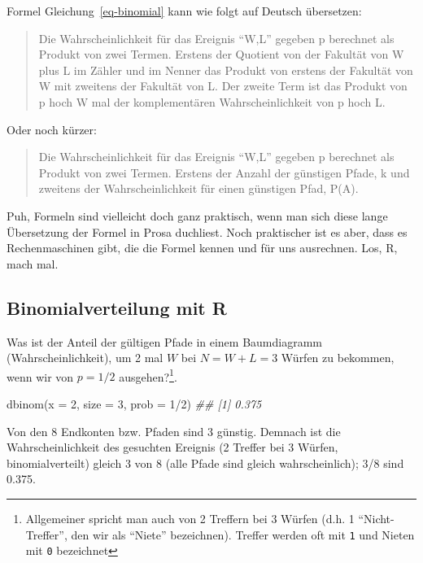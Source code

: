 \documentclass[
  a4paper,
  DIV=11]{scrreprt}
\newenvironment{Shaded}{\begin{snugshade}}{\end{snugshade}}
\newcommand{\AttributeTok}[1]{\textcolor[rgb]{0.40,0.45,0.13}{#1}}
\newcommand{\DecValTok}[1]{\textcolor[rgb]{0.68,0.00,0.00}{#1}}
\newcommand{\DocumentationTok}[1]{\textcolor[rgb]{0.37,0.37,0.37}{\textit{#1}}}
\newcommand{\FunctionTok}[1]{\textcolor[rgb]{0.28,0.35,0.67}{#1}}
\newcommand{\NormalTok}[1]{\textcolor[rgb]{0.00,0.23,0.31}{#1}}
\newcommand{\SpecialCharTok}[1]{\textcolor[rgb]{0.37,0.37,0.37}{#1}}
\theoremstyle{definition}
\theoremstyle{remark}
\begin{document}
Formel Gleichung~\ref{eq-binomial} kann wie folgt auf Deutsch
übersetzen:

\begin{quote}
Die Wahrscheinlichkeit für das Ereignis ``W,L'' gegeben p berechnet als
Produkt von zwei Termen. Erstens der Quotient von der Fakultät von W
plus L im Zähler und im Nenner das Produkt von erstens der Fakultät von
W mit zweitens der Fakultät von L. Der zweite Term ist das Produkt von p
hoch W mal der komplementären Wahrscheinlichkeit von p hoch L.
\end{quote}

Oder noch kürzer:

\begin{quote}
Die Wahrscheinlichkeit für das Ereignis ``W,L'' gegeben p berechnet als
Produkt von zwei Termen. Erstens der Anzahl der günstigen Pfade, k und
zweitens der Wahrscheinlichkeit für einen günstigen Pfad, P(A).
\end{quote}

Puh, Formeln sind vielleicht doch ganz praktisch, wenn man sich diese
lange Übersetzung der Formel in Prosa duchliest. Noch praktischer ist es
aber, dass es Rechenmaschinen gibt, die die Formel kennen und für uns
ausrechnen. Los, R, mach mal.

\hypertarget{binomialverteilung-mit-r}{%
\subsection{Binomialverteilung mit R}\label{binomialverteilung-mit-r}}

Was ist der Anteil der gültigen Pfade in einem Baumdiagramm
(Wahrscheinlichkeit), um 2 mal \(W\) bei \(N=W+L=3\) Würfen zu bekommen,
wenn wir von \(p=1/2\) ausgehen?\footnote{Allgemeiner spricht man auch
  von 2 Treffern bei 3 Würfen (d.h. 1 ``Nicht-Treffer'', den wir als
  ``Niete'' bezeichnen). Treffer werden oft mit \texttt{1} und Nieten
  mit \texttt{0} bezeichnet}.

\begin{Shaded}
\begin{Highlighting}[]
\FunctionTok{dbinom}\NormalTok{(}\AttributeTok{x =} \DecValTok{2}\NormalTok{, }\AttributeTok{size =} \DecValTok{3}\NormalTok{, }\AttributeTok{prob =} \DecValTok{1}\SpecialCharTok{/}\DecValTok{2}\NormalTok{)}
\DocumentationTok{\#\# [1] 0.375}
\end{Highlighting}
\end{Shaded}

Von den 8 Endkonten bzw. Pfaden sind 3 günstig. Demnach ist die
Wahrscheinlichkeit des gesuchten Ereignis (2 Treffer bei 3 Würfen,
binomialverteilt) gleich 3 von 8 (alle Pfade sind gleich
wahrscheinlich); 3/8 sind 0.375.
\end{document}
